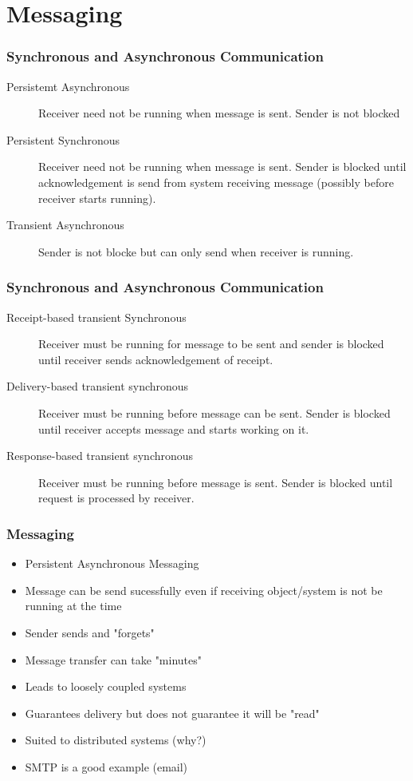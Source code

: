 \documentclass{beamer}
\begin{document}
\section{Messaging}
      \begin{frame}
      	\frametitle{Synchronous and Asynchronous Communication}
      	\begin{description}
      		\item [Persistemt Asynchronous] Receiver need not be running when message is sent. Sender is not blocked
      		\item[Persistent Synchronous] Receiver need not be running when message is sent. Sender is blocked until  acknowledgement is send from system receiving message (possibly before receiver starts running).
      		\item[Transient Asynchronous] Sender is not blocke but can only send when receiver is running.
      		
      	\end{description}
      \end{frame} 
      \begin{frame}
      	\frametitle{Synchronous and Asynchronous Communication}
      	\begin{description}
      		\item[Receipt-based transient Synchronous] Receiver must be running for message to be sent and sender is blocked until receiver sends acknowledgement of receipt.
      		\item[Delivery-based transient synchronous] Receiver must be running before message can be sent. Sender is blocked until receiver accepts message and starts working on it.
      		\item[Response-based transient synchronous] Receiver must be running before message is sent. Sender is blocked until request is processed by receiver.
      	\end{description}
      \end{frame} 
      \begin{frame}
      	\frametitle{Messaging}
      	\begin{itemize}
      		\item Persistent Asynchronous Messaging
      		\item Message can be send sucessfully even if receiving object/system is not be running at the time
      		\item Sender sends and "forgets"
      		\item Message transfer can take "minutes"
      		\item Leads to loosely coupled systems
      		\item Guarantees delivery but does not guarantee it will be "read" 
      		\item Suited to distributed systems (why?)
      		\item SMTP is a good example (email)
      	\end{itemize}
      \end{frame} 
\end{document}
